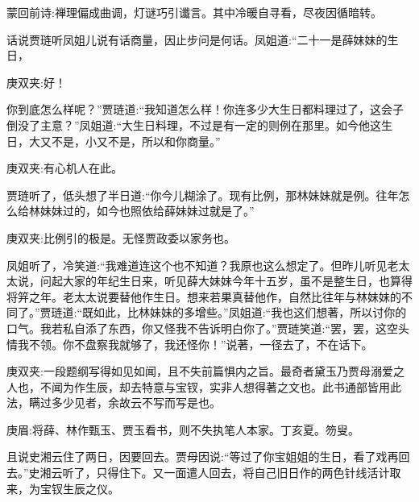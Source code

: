 
\begin{parag}
    \begin{note}蒙回前诗:禅理偏成曲调，灯谜巧引谶言。其中冷暖自寻看，尽夜因循暗转。\end{note}
\end{parag}


\begin{parag}
    话说贾琏听凤姐儿说有话商量，因止步问是何话。凤姐道:“二十一是薛妹妹的生日，\begin{note}庚双夹:好！\end{note}你到底怎么样呢？”贾琏道:“我知道怎么样！你连多少大生日都料理过了，这会子倒没了主意？”凤姐道:“大生日料理，不过是有一定的则例在那里。如今他这生日，大又不是，小又不是，所以和你商量。”\begin{note}庚双夹:有心机人在此。\end{note}贾琏听了，低头想了半日道:“你今儿糊涂了。现有比例，那林妹妹就是例。往年怎么给林妹妹过的，如今也照依给薛妹妹过就是了。”\begin{note}庚双夹:比例引的极是。无怪贾政委以家务也。\end{note}凤姐听了，冷笑道:“我难道连这个也不知道？我原也这么想定了。但昨儿听见老太太说，问起大家的年纪生日来，听见薛大妹妹今年十五岁，虽不是整生日，也算得将笄之年。老太太说要替他作生日。想来若果真替他作，自然比往年与林妹妹的不同了。”贾琏道:“既如此，比林妹妹的多增些。”凤姐道:“我也这们想著，所以讨你的口气。我若私自添了东西，你又怪我不告诉明白你了。”贾琏笑道:“罢，罢，这空头情我不领。你不盘察我就够了，我还怪你！”说著，一径去了，不在话下。\begin{note}庚双夹:一段题纲写得如见如闻，且不失前篇惧内之旨。最奇者黛玉乃贾母溺爱之人也，不闻为作生辰，却去特意与宝钗，实非人想得著之文也。此书通部皆用此法，瞒过多少见者，余故云不写而写是也。\end{note}\begin{note}庚眉:将薛、林作甄玉、贾玉看书，则不失执笔人本家。丁亥夏。笏叟。\end{note}
\end{parag}


\begin{parag}
    且说史湘云住了两日，因要回去。贾母因说:“等过了你宝姐姐的生日，看了戏再回去。”史湘云听了，只得住下。又一面遣人回去，将自己旧日作的两色针线活计取来，为宝钗生辰之仪。
\end{parag}


